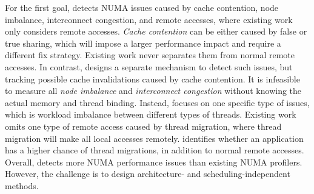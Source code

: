For the first goal, \NP{} detects NUMA issues caused by cache contention, node imbalance, interconnect congestion, and remote accesses, where existing work only considers remote accesses.  \textit{Cache contention} can be either caused by false or true sharing, which will impose a larger performance impact and require a different fix strategy. Existing work never separates them from normal remote accesses. In contrast, \NP{} designs a separate mechanism to detect such issues, but tracking possible cache invalidations caused by cache contention. 
It is infeasible to measure all \textit{node imbalance} and \textit{interconnect congestion} without knowing the actual memory and thread binding. Instead, \NP{} focuses on one specific type of issues, which is workload imbalance between different types of threads. 
Existing work omits one type of remote access caused by thread migration, where thread migration will make all local accesses remotely. 
\NP{} identifies whether an application has a higher chance of thread migrations, in addition to normal remote accesses. 
Overall, \NP{} detects more NUMA performance issues than existing NUMA profilers. However, the challenge is to design architecture- and scheduling-independent methods. 

